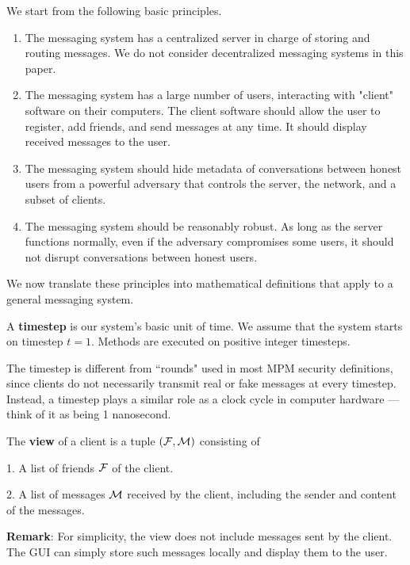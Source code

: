 We start from the following basic principles.
\begin{enumerate}
    \item The messaging system has a centralized server in charge of storing and routing messages. We do not consider decentralized messaging systems in this paper.
    \item The messaging system has a large number of users, interacting with "client" software on their computers. The client software should allow the user to register, add friends, and send messages at any time. It should display received messages to the user.
    \item The messaging system should hide metadata of conversations between honest users from a powerful adversary that controls the server, the network, and a subset of clients. 
    \item The messaging system should be reasonably robust. As long as the server functions normally, even if the adversary compromises some users, it should not disrupt conversations between honest users.
\end{enumerate}
We now translate these principles into mathematical definitions that apply to a general messaging system.
\begin{definition}
\label{defn:messaging-timestep}
A \textbf{timestep} is our system's basic unit of time. We assume that the system starts on timestep $t = 1$. Methods are executed on positive integer timesteps.

The timestep is different from ``rounds" used in most MPM security definitions, since clients do not necessarily transmit real or fake messages at every timestep. Instead, a timestep plays a similar role as a clock cycle in computer hardware — think of it as being 1 nanosecond. 
\end{definition}
\begin{definition}
\label{defn:messaging-client-view}
The \textbf{view} of a client is a tuple $(\mathcal{F}, \mathcal{M})$ consisting of

1. A list of friends $\mathcal{F}$ of the client.

2. A list of messages $\mathcal{M}$ received by the client, including the sender and content of the messages.
\end{definition}
\textbf{Remark}: For simplicity, the view does not include messages sent by the client. The GUI can simply store such messages locally and display them to the user.
